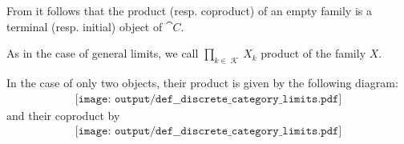 \begin{definition}
  From  it follows that the product (resp. coproduct) of an empty family is a terminal (resp. initial) object of \( \cat{C} \).

  As in the case of general limits, we call \( \prod_{k \in \mscrK} X_k \)  product of the family \( X \).

  In the case of only two objects, their product is given by the following diagram:
  \begin{equation}\label{eq:def:discrete_category_limits/product/binary}
    \begin{aligned}
      \texttt{[image: output/def\_\_discrete\_category\_limits.pdf]}
    \end{aligned}
  \end{equation}
  and their coproduct by
  \begin{equation}\label{eq:def:discrete_category_limits/coproduct/binary}
    \begin{aligned}
      \texttt{[image: output/def\_\_discrete\_category\_limits.pdf]}
    \end{aligned}
  \end{equation}
\end{definition}


